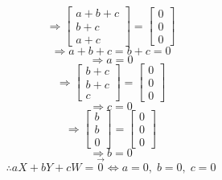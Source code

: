 \documentclass{article}
\begin{document}
$$\Rightarrow\begin{bmatrix}a+b+c\\b+c\\a+c\end{bmatrix}=\begin{bmatrix}0\\0\\0\end{bmatrix}$$
$$\Rightarrow a+b+c=b+c=0$$
$$\Rightarrow a=0$$
$$\Rightarrow\begin{bmatrix}b+c\\b+c\\c\end{bmatrix}=\begin{bmatrix}0\\0\\0\end{bmatrix}$$
$$\Rightarrow c=0$$
$$\Rightarrow\begin{bmatrix}b\\b\\0\end{bmatrix}=\begin{bmatrix}0\\0\\0\end{bmatrix}$$
$$\Rightarrow b=0$$
$$\therefore aX+bY+cW=\vec{0}\Leftrightarrow a=0,\; b=0,\; c=0$$\\
\vspace{3mm}
\end{document}
